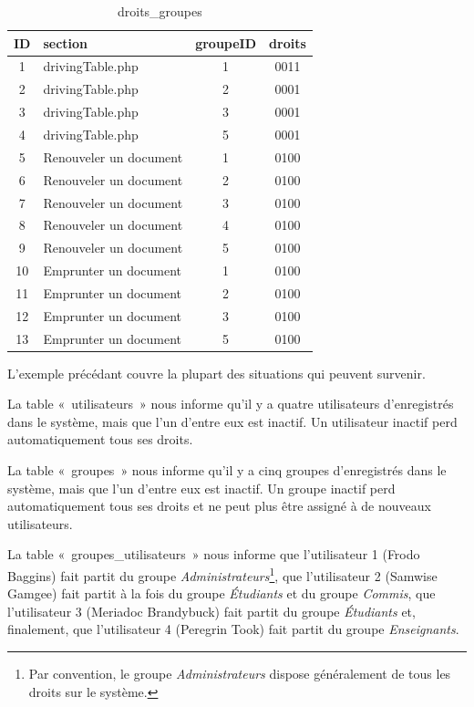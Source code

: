 \documentclass[letter, 11pt]{report}
\begin{document}
\begin{table}[h!]
	\caption{droits\_groupes}
	\begin{center}
		\begin{tabular}{|c|l|c|c|}
			\hline
			ID & section                & groupeID & droits \\
			\hline
			1  & drivingTable.php       & 1        & 0011 \\
			2  & drivingTable.php       & 2        & 0001 \\
			3  & drivingTable.php       & 3        & 0001 \\
			4  & drivingTable.php       & 5        & 0001 \\
			5  & Renouveler un document & 1        & 0100 \\
			6  & Renouveler un document & 2        & 0100 \\
			7  & Renouveler un document & 3        & 0100 \\
			8  & Renouveler un document & 4        & 0100 \\
			9  & Renouveler un document & 5        & 0100 \\
			10 & Emprunter un document  & 1        & 0100 \\
			11 & Emprunter un document  & 2        & 0100 \\
			12 & Emprunter un document  & 3        & 0100 \\
			13 & Emprunter un document  & 5        & 0100 \\
			\hline
		\end{tabular}
	\end{center}
\end{table}

L'exemple précédant couvre la plupart des situations qui peuvent survenir.

La table «~utilisateurs~» nous informe qu'il y a quatre utilisateurs d'enregistrés dans le système, mais que l'un d'entre eux est inactif. Un utilisateur inactif perd automatiquement tous ses droits.

La table «~groupes~» nous informe qu'il y a cinq groupes d'enregistrés dans le système, mais que l'un d'entre eux est inactif. Un groupe inactif perd automatiquement tous ses droits et ne peut plus être assigné à de nouveaux utilisateurs.

La table «~groupes\_utilisateurs~» nous informe que l'utilisateur 1 (Frodo Baggins) fait partit du groupe \emph{Administrateurs}\footnote{Par convention, le groupe \emph{Administrateurs} dispose généralement de tous les droits sur le système.}, que l'utilisateur 2 (Samwise Gamgee) fait partit à la fois du groupe \emph{Étudiants} et du groupe \emph{Commis}, que l'utilisateur 3 (Meriadoc Brandybuck) fait partit du groupe \emph{Étudiants} et, finalement, que l'utilisateur 4 (Peregrin Took) fait partit du groupe \emph{Enseignants}.
\end{document}
